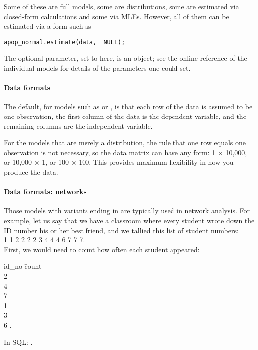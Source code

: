 Some of these are full models, some are distributions, some are
estimated via closed-form calculations and some via MLEs. However, all
of them can be estimated via a form such as
\begin{lstlisting}
apop_normal.estimate(data,  NULL);
\end{lstlisting}

The optional parameter, set to  here,
is an  object; see
the online reference of the individual models for details of the
parameters one could set.

\paragraph{Data formats} \label{dataformats} 
The default, for models such as  or
, is that each row of the data is assumed to be one
observation, the first column of the data is the dependent
variable, and the remaining columns are the independent variable.

For the models that are merely a distribution, the rule that one row equals one observation is not necessary, so the data matrix can have
any form: 1 $\times$ 10,000, or 10,000 $\times$ 1, or 100 $\times$ 100.
This provides maximum flexibility in how you produce the data.

\paragraph{\treesymbol{} Data formats: networks} 
Those models with variants ending in  are typically used
in network analysis. For example, let us say that we have a classroom
where every student wrote down the ID number his or her best friend,
and we tallied this list of student numbers:\\
1 1 2 2 2 2 3 4 4 4 6 7 7 7.\\ 
First, we would need to count how often each student appeared:\\

\begin{tabbing}
id\_no \= count\\
2 \\
4 \\
7 \\
1 \\
3 \\
6 .
\end{tabbing}
In SQL: .

